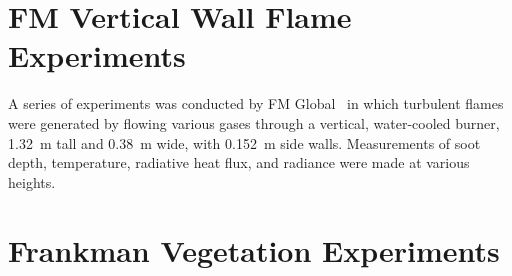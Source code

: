 %
%
%

\section{FM Vertical Wall Flame Experiments}
\label{FM_Vertical_Wall_Flame_Description}

A series of experiments was conducted by FM Global~\cite{deRis:IAFSS} in which turbulent flames were generated by flowing various gases through a vertical, water-cooled burner, 1.32~m tall and 0.38~m wide, with 0.152~m side walls. Measurements of soot depth, temperature, radiative heat flux, and radiance were made at various heights.


\section{Frankman Vegetation Experiments}
\label{Frankman_Vegetation_Description}

